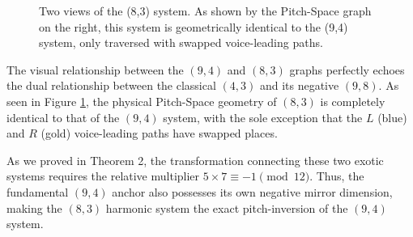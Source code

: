 \documentclass[11pt,letterpaper]{amsart}
\begin{document}
\begin{figure}[H]
\begin{minipage}{0.48\textwidth}
        \caption*{Pitch-Space Layout \\ (Geometric Rewiring)}
    \end{minipage}
    \caption{Two views of the (8,3) system. As shown by the Pitch-Space graph on the right, this system is geometrically identical to the (9,4) system, only traversed with swapped voice-leading paths.}
    \label{fig:fundamental_mirror}
\end{figure}


The visual relationship between the $(9,4)$ and $(8,3)$ graphs perfectly echoes the dual relationship between the classical $(4,3)$ and its negative $(9,8)$. As seen in Figure \ref{fig:fundamental_mirror}, the physical Pitch-Space geometry of $(8,3)$ is completely identical to that of the $(9,4)$ system, with the sole exception that the $L$ (blue) and $R$ (gold) voice-leading paths have swapped places. 

As we proved in Theorem 2, the transformation connecting these two exotic systems requires the relative multiplier $5 \times 7 \equiv -1 \pmod{12}$. Thus, the fundamental $(9,4)$ anchor also possesses its own negative mirror dimension, making the $(8,3)$ harmonic system the exact pitch-inversion of the $(9,4)$ system.
\end{document}
